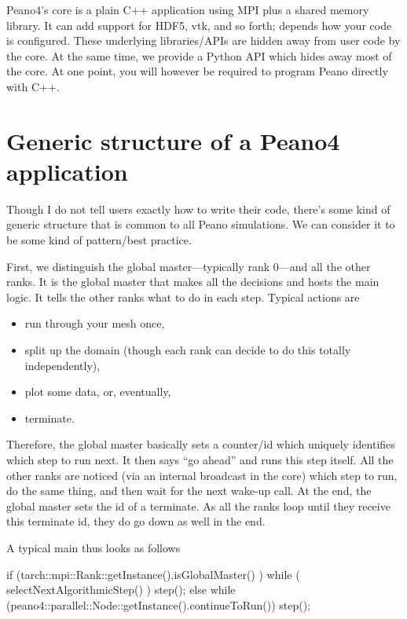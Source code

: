 
\noindent
Peano4's core is a plain C++ application using MPI plus a shared memory
library.
It can add support for HDF5, vtk, and so forth;
depends how your code is configured.
These underlying libraries/APIs are hidden away from user code by the core.
At the same time, we provide a Python API which hides away most of the core.
At one point, you will however be required to program Peano directly with C++. 


 
 
\section*{Generic structure of a Peano4 application}

Though I do not tell users exactly how to write their code, there's some kind of
generic structure that is common to all Peano simulations.
We can consider it to be some kind of pattern/best practice.


First, we distinguish the global master---typically rank 0---and all the other
ranks.
It is the global master that makes all the decisions and hosts the main logic.
It tells the other ranks what to do in each step. 
Typical actions are
\begin{itemize}
  \item run through your mesh once,
  \item split up the domain (though each rank can decide to do this totally
  independently),
  \item plot some data, or, eventually,
  \item terminate.
\end{itemize}


Therefore, the global master basically sets a counter/id which uniquely
identifies which step to run next.
It then says ``go ahead'' and runs this step itself.
All the other ranks are noticed (via an internal broadcast in the core) which
step to run, do the same thing, and then wait for the next wake-up call.
At the end, the global master sets the id of a terminate.
As all the ranks loop until they receive this terminate id, they do go down as
well in the end.


A typical main thus looks as follows
\begin{code}
  if (tarch::mpi::Rank::getInstance().isGlobalMaster() ) {
    while ( selectNextAlgorithmicStep() ) {
      step();
    }
  }
  else {
    while (peano4::parallel::Node::getInstance().continueToRun()) {
      step();
    }
  }
\end{code}


